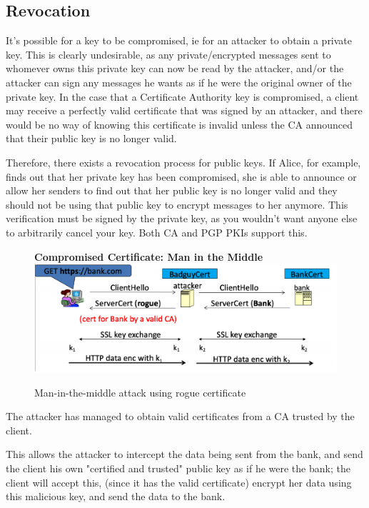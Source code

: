 \documentclass[11pt]{article} %
\begin{document}
\subsection{Revocation}
It's possible for a key to be compromised, ie for an attacker to obtain a 
private key. This is clearly undesirable, as any private/encrypted messages 
sent to whomever owns this private key can now be read by the attacker, and/or 
the attacker can sign any messages he wants as if he were the original owner of
the private key. In the case that a Certificate Authority key is compromised, a
client may receive a perfectly valid certificate that was signed by an attacker,
and there would be no way of knowing this certificate is invalid unless the CA 
announced that their public key is no longer valid.

\bigskip
Therefore, there exists a revocation process for public keys. If Alice, for 
example, finds out that her private key has been compromised, she is able to 
announce or allow her senders to find out that her public key is no longer valid
and they should not be using that public key to encrypt messages to her anymore.
This verification must be signed by the private key, as you wouldn't want anyone
else to arbitrarily cancel your key. Both CA and PGP PKIs support this. 

\begin{figure}
    \centering
    \textbf{Compromised Certificate: Man in the Middle}
    \includegraphics[scale=.4]{./cert3.png}
    \caption{Man-in-the-middle attack using rogue certificate}

\end{figure}

\bigskip
{\parindent0pt The attacker has managed to obtain valid certificates from a CA 
trusted by the client.}

\bigskip
{\parindent0pt This allows the attacker to intercept the data being sent from the
bank, and send the client his own "certified and trusted" public key as if 
he were the bank; the client will accept this, (since it has the valid 
certificate) encrypt her data using this malicious key, and send the 
data to the bank.}
\end{document}
